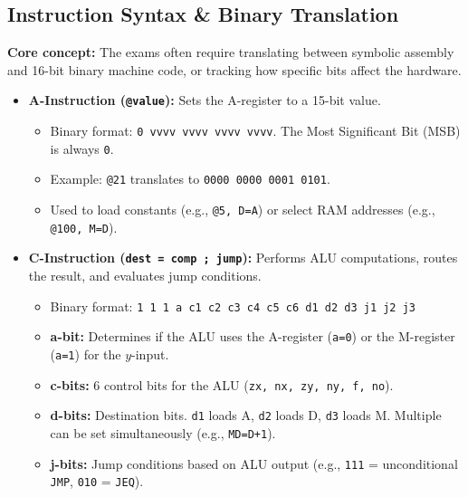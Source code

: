 \documentclass[12pt,a4paper]{article}
\begin{document}
\subsection{Instruction Syntax \& Binary Translation}
\textbf{Core concept:} The exams often require translating between symbolic assembly and 16-bit binary machine code, or tracking how specific bits affect the hardware.
\begin{itemize}
    \item \textbf{A-Instruction (\texttt{@value}):} Sets the A-register to a 15-bit value. 
    \begin{itemize}
        \item Binary format: \texttt{0 vvvv vvvv vvvv vvvv}. The Most Significant Bit (MSB) is always \texttt{0}.
        \item Example: \texttt{@21} translates to \texttt{0000 0000 0001 0101}.
        \item Used to load constants (e.g., \texttt{@5, D=A}) or select RAM addresses (e.g., \texttt{@100, M=D}).
    \end{itemize}
    \item \textbf{C-Instruction (\texttt{dest = comp ; jump}):} Performs ALU computations, routes the result, and evaluates jump conditions.
    \begin{itemize}
        \item Binary format: \texttt{1 1 1 a c1 c2 c3 c4 c5 c6 d1 d2 d3 j1 j2 j3}
        \item \textbf{a-bit:} Determines if the ALU uses the A-register (\texttt{a=0}) or the M-register (\texttt{a=1}) for the $y$-input.
        \item \textbf{c-bits:} 6 control bits for the ALU (\texttt{zx, nx, zy, ny, f, no}).
        \item \textbf{d-bits:} Destination bits. \texttt{d1} loads A, \texttt{d2} loads D, \texttt{d3} loads M. Multiple can be set simultaneously (e.g., \texttt{MD=D+1}).
        \item \textbf{j-bits:} Jump conditions based on ALU output (e.g., \texttt{111} = unconditional \texttt{JMP}, \texttt{010} = \texttt{JEQ}).
    \end{itemize}
\end{itemize}
\end{document}
